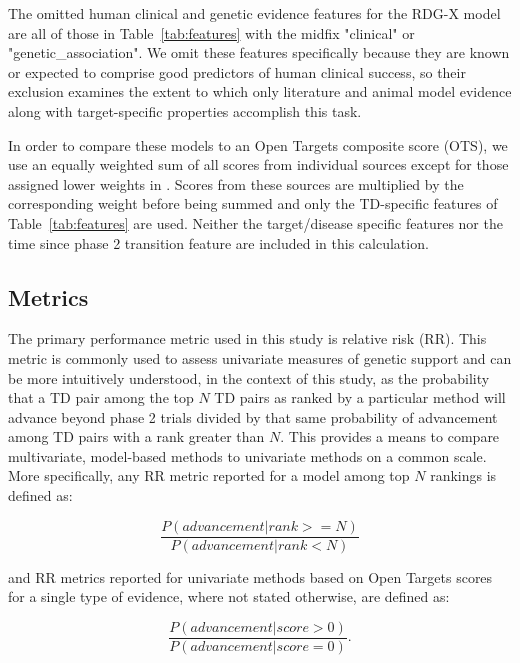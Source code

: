 \documentclass{article}
\begin{document}
The omitted human clinical and genetic evidence features for the RDG-X model are all of those in Table~\ref{tab:features} with the midfix "clinical" or "genetic\_association". We omit these features specifically because they are known or expected to comprise good predictors of human clinical success, so their exclusion examines the extent to which only literature and animal model evidence along with target-specific properties accomplish this task.

In order to compare these models to an Open Targets composite score (OTS), we use an equally weighted sum of all scores from individual sources except for those assigned lower weights in \cite{OTweights}. Scores from these sources are multiplied by the corresponding weight before being summed and only the TD-specific features of Table~\ref{tab:features} are used. Neither the target/disease specific features nor the time since phase 2 transition feature are included in this calculation.

\subsection{Metrics}
\label{sec:metrics}

The primary performance metric used in this study is relative risk (RR). This metric is commonly used to assess univariate measures of genetic support \cite{Nelson2015-eg,King2019-rc,Minikel2023.06.23.23291765} and can be more intuitively understood, in the context of this study, as the probability that a TD pair among the top $N$ TD pairs as ranked by a particular method will advance beyond phase 2 trials divided by that same probability of advancement among TD pairs with a rank greater than $N$. This provides a means to compare multivariate, model-based methods to univariate methods on a common scale. More specifically, any RR metric reported for a model among top $N$ rankings is defined as:

\begin{equation}
  \frac{P(advancement | rank >= N)}{P(advancement | rank < N)}
\end{equation}

and RR metrics reported for univariate methods based on Open Targets scores for a single type of evidence, where not stated otherwise, are defined as:

\begin{equation}
  \frac{P(advancement | score > 0)}{P(advancement | score = 0)}.
\end{equation}
\end{document}
